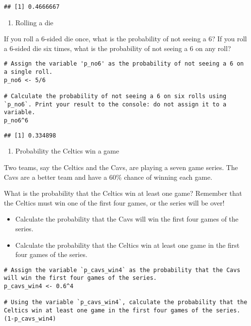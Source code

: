\documentclass[
]{article}
\providecommand{\tightlist}{%
  \setlength{\itemsep}{0pt}\setlength{\parskip}{0pt}}
\begin{document}
\begin{verbatim}
## [1] 0.4666667
\end{verbatim}

\begin{enumerate}
\def\labelenumi{\arabic{enumi}.}
\setcounter{enumi}{2}
\tightlist
\item
  Rolling a die
\end{enumerate}

If you roll a 6-sided die once, what is the probability of not seeing a
6? If you roll a 6-sided die six times, what is the probability of not
seeing a 6 on any roll?

\begin{verbatim}
# Assign the variable 'p_no6' as the probability of not seeing a 6 on a single roll.
p_no6 <- 5/6

# Calculate the probability of not seeing a 6 on six rolls using `p_no6`. Print your result to the console: do not assign it to a variable.
p_no6^6
\end{verbatim}

\begin{verbatim}
## [1] 0.334898
\end{verbatim}

\begin{enumerate}
\def\labelenumi{\arabic{enumi}.}
\setcounter{enumi}{3}
\tightlist
\item
  Probability the Celtics win a game
\end{enumerate}

Two teams, say the Celtics and the Cavs, are playing a seven game
series. The Cavs are a better team and have a 60\% chance of winning
each game.

What is the probability that the Celtics win at least one game? Remember
that the Celtics must win one of the first four games, or the series
will be over!

\begin{itemize}
\tightlist
\item
  Calculate the probability that the Cavs will win the first four games
  of the series.
\item
  Calculate the probability that the Celtics win at least one game in
  the first four games of the series.
\end{itemize}

\begin{verbatim}
# Assign the variable `p_cavs_win4` as the probability that the Cavs will win the first four games of the series.
p_cavs_win4 <- 0.6^4

# Using the variable `p_cavs_win4`, calculate the probability that the Celtics win at least one game in the first four games of the series.
(1-p_cavs_win4)
\end{verbatim}
\end{document}
